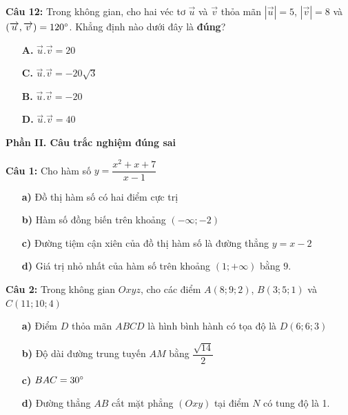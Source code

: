 \documentclass[12pt, a4paper]{article}
\begin{document}
\pagebreak

\textbf{Câu 12: } Trong không gian, cho hai véc tơ $ \overrightarrow{u} $ và $ \overrightarrow{v} $ thỏa mãn $\left| \overrightarrow{u} \right| = 5 $, $\left| \overrightarrow{v} \right| = 8 $ và $ \left( \overrightarrow{u}, \overrightarrow{v} \right) = 120\degree $. Khẳng định nào dưới đây là \textbf{đúng}?
	\begin{multicols}{2}
		\begin{enumerate}
			\item[\textbf{A.}] $ \overrightarrow{u}.\overrightarrow{v} = 20 $
			\item[\textbf{C.}] $ \overrightarrow{u}.\overrightarrow{v} = -20\sqrt{3} $
			\item[\textbf{B.}] $ \overrightarrow{u}.\overrightarrow{v} = -20 $
			\item[\textbf{D.}] $ \overrightarrow{u}.\overrightarrow{v} = 40 $
		\end{enumerate}
	\end{multicols}
\vspace{-0.75cm}
	
\textbf{Phần II. Câu trắc nghiệm đúng sai}

\textbf{Câu 1: } Cho hàm số $ y = \dfrac{x^2 + x + 7}{x - 1} $ 
\vspace{-0.5cm}
	\begin{enumerate}
		\item[\textbf{a)}] Đồ thị hàm số có hai điểm cực trị
		\item[\textbf{b)}] Hàm số đồng biến trên khoảng $ (-\infty; -2) $
		\item[\textbf{c)}] Đường tiệm cận xiên của đồ thị hàm số là đường thẳng $ y = x - 2 $ 
		\item[\textbf{d)}] Giá trị nhỏ nhất của hàm số trên khoảng $ (1; +\infty) $ bằng $ 9 $.
	\end{enumerate}	
	
\textbf{Câu 2: } Trong không gian $ Oxyz $, cho các điểm $ A(8;9;2) $, $ B(3;5;1) $ và $ C(11;10;4) $
\vspace{-0.5cm}
	\begin{enumerate}
		\item[\textbf{a)}] Điểm $ D $ thỏa mãn $ ABCD $ là hình bình hành có tọa độ là $ D(6;6;3) $
		\item[\textbf{b)}] Độ dài đường trung tuyến $ AM $ bằng $ \dfrac{\sqrt{14}}{2} $
		\item[\textbf{c)}] $ BAC = 30 \degree $
		\item[\textbf{d)}] Đường thẳng $ AB $ cắt mặt phẳng $ (Oxy) $ tại điểm $ N $ có tung độ là 1.
	\end{enumerate}
\end{document}

